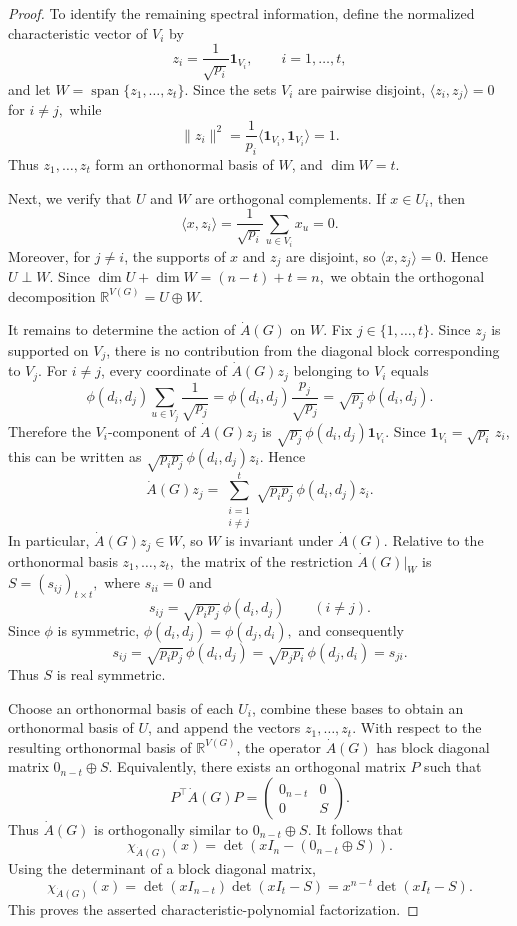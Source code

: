 \documentclass[10pt,a4paper]{amsart}
\begin{document}
\begin{proof}
	To identify the remaining spectral information, define the normalized characteristic vector of $V_i$ by
	$$
	z_i
	=
	\frac{1}{\sqrt{p_i}}\mathbf 1_{V_i},
	\qquad i=1,\ldots,t,
	$$
	and let
	$
	W=\operatorname{span}\{z_1,\ldots,z_t\}.
	$
	Since the sets $V_i$ are pairwise disjoint,
	$
	\langle z_i,z_j\rangle=0$ for $i\neq j,$
	while
	$$
	\|z_i\|^2
	=
	\frac{1}{p_i}\langle\mathbf 1_{V_i},\mathbf 1_{V_i}\rangle
	=
	1.
	$$
	Thus
	$
	z_1,\ldots,z_t
	$
	form an orthonormal basis of $W$, and
	$
	\dim W=t.
	$
	
	Next, we verify that $U$ and $W$ are orthogonal complements. If $x\in U_i$, then
	$$
	\langle x,z_i\rangle
	=
	\frac{1}{\sqrt{p_i}}
	\sum_{u\in V_i}x_u
	=
	0.
	$$
	Moreover, for $j\neq i$, the supports of $x$ and $z_j$ are disjoint, so
	$
	\langle x,z_j\rangle=0.
	$
	Hence
	$
	U\perp W.
	$
	Since
	$
	\dim U+\dim W=(n-t)+t=n,
	$
	we obtain the orthogonal decomposition
	$
	\mathbb R^{V(G)}=U\oplus W.
	$
	
	It remains to determine the action of $\dot A(G)$ on $W$. Fix $j\in\{1,\ldots,t\}$. Since $z_j$ is supported on $V_j$, there is no contribution from the diagonal block corresponding to $V_j$. For $i\neq j$, every coordinate of $\dot A(G)z_j$ belonging to $V_i$ equals
	$$
	\phi(d_i,d_j)
	\sum_{u\in V_j}\frac{1}{\sqrt{p_j}}
	=
	\phi(d_i,d_j)\frac{p_j}{\sqrt{p_j}}
	=
	\sqrt{p_j}\,\phi(d_i,d_j).
	$$
	Therefore the $V_i$-component of $\dot A(G)z_j$ is
	$
	\sqrt{p_j}\,\phi(d_i,d_j)\mathbf 1_{V_i}.
	$
	Since
	$
	\mathbf 1_{V_i}=\sqrt{p_i}\,z_i,
	$
	this can be written as
	$
	\sqrt{p_ip_j}\,\phi(d_i,d_j)z_i.
	$
	Hence
	$$
	\dot A(G)z_j
	=
	\sum_{\substack{i=1\\i\neq j}}^t
	\sqrt{p_ip_j}\,\phi(d_i,d_j)z_i.
	$$
	In particular, $\dot A(G)z_j\in W$, so $W$ is invariant under $\dot A(G)$.
	 Relative to the orthonormal basis
	$
	z_1,\ldots,z_t,
	$
	the matrix of the restriction $\dot A(G)|_W$ is 
	$
	S=(s_{ij})_{t\times t},
	$
	where
	$
	s_{ii}=0
	$
	and
	$$
	s_{ij}
	=
	\sqrt{p_ip_j}\,\phi(d_i,d_j)
	\qquad(i\neq j).
	$$
	Since $\phi$ is symmetric,
	$
	\phi(d_i,d_j)=\phi(d_j,d_i),
	$
	and consequently
	$$
	s_{ij}
	=
	\sqrt{p_ip_j}\,\phi(d_i,d_j)
	=
	\sqrt{p_jp_i}\,\phi(d_j,d_i)
	=
	s_{ji}.
	$$
	Thus $S$ is real symmetric.
	
	Choose an orthonormal basis of each $U_i$, combine these bases to obtain an orthonormal basis of $U$, and append the vectors
	$
	z_1,\ldots,z_t.
	$
	With respect to the resulting orthonormal basis of $\mathbb R^{V(G)}$, the operator $\dot A(G)$ has block diagonal matrix
	$
	0_{n-t}\oplus S.
	$
	Equivalently, there exists an orthogonal matrix $P$ such that
	$$
	P^{\top}\dot A(G)P
	=
	\begin{pmatrix}
		0_{n-t}&0\\
		0&S
	\end{pmatrix}.
	$$
	Thus $\dot A(G)$ is orthogonally similar to $0_{n-t}\oplus S$. It follows that
	$$
	\chi_{\dot A(G)}(x)
	=
	\det\left(xI_n-(0_{n-t}\oplus S)\right).
	$$
	Using the determinant of a block diagonal matrix,
	$$
	\chi_{\dot A(G)}(x)
	=
	\det(xI_{n-t})\det(xI_t-S)
	=
	x^{n-t}\det(xI_t-S).
	$$
	This proves the asserted characteristic-polynomial factorization.
	

\end{proof}
\end{document}
